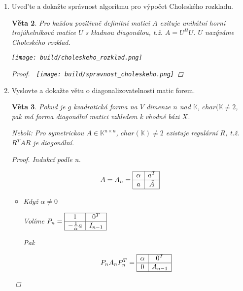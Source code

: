\documentclass[10pt,a4paper]{article}
\theoremstyle{plain}
\newtheorem{veta}{Věta}
\begin{document}
\begin{enumerate}
\begin{veta} [Sylvesterova podmínka]
\begin{proof}
\[A \text{ je pozitivně definitní } \iff \alpha_1, ..., \alpha_n > 0 \iff \det(A_1), ..., \det(A_n) > 0 \]
\end{proof}
\end{veta}

\item Uved'te a dokažte správnost algoritmu pro výpočet Choleského rozkladu.

 
\begin{veta}
Pro každou pozitivně definitní matici $A$ exituje unikátní horní trojúhelníková matice $U$ s kladnou diagonálou, t.ž. $A = U^HU$. $U$ nazýváme Choleského rozklad.


\texttt{[image: build/choleskeho\_rozklad.png]}
\begin{proof}$\ $
 \texttt{[image: build/spravnost\_choleskeho.png]} 
\end{proof}
\end{veta}

\item Vyslovte a dokažte větu o diagonalizovatelnosti matic forem.

\begin{veta}
Pokud je $g$ kvadratická forma na $V$ dimenze $n$ nad $\mathbb{K}$, $char(\mathbb{K} \neq 2$, pak má forma diagonální matici vzhledem k vhodné bázi $X$.

Neboli: Pro symetrickou $A \in \mathbb{K}^{n \times n}$, $char(\mathbb{K}) \neq 2$ existuje regulární $R$, t.ž. $R^TAR$ je diagonální.
\begin{proof} 
Indukcí podle n.

\[ A = A_n = \begin{array}{|c|c|} \hline  \alpha & a^T  \\ \hline  a & \tilde{A} \\ \hline \end{array} \] \begin{itemize}

\item Když $\alpha \neq 0$

Volíme $P_n = \begin{array}{|c|c|} \hline  1 & 0^T  \\ \hline  -\frac{1}{\alpha}a & I_{n-1} \\ \hline \end{array} $

Pak 

\[P_nA_nP_n^T =  \begin{array}{|c|c|} \hline  \alpha & 0^T  \\ \hline  0 & A_{n-1} \\ \hline \end{array} \]


\end{itemize}
\end{proof}
\end{veta}
\end{enumerate}
\end{document}
